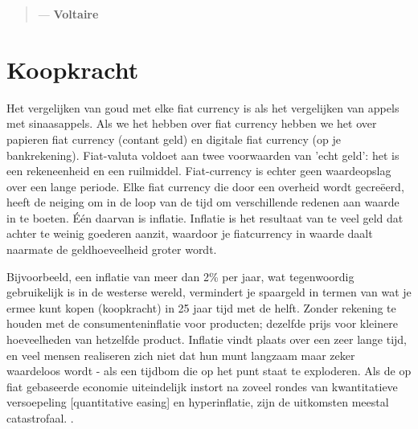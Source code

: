 \begin{quotation}

      \textit{}
      \begin{flushright}
        \small{--- \textbf{Voltaire}}
      \end{flushright}
    
\end{quotation}

\section{Koopkracht}
Het vergelijken van goud met elke fiat currency is als het vergelijken van appels met sinaasappels. Als we het hebben over fiat currency hebben we het over papieren fiat currency (contant geld) en digitale fiat currency (op je bankrekening).  Fiat-valuta voldoet aan twee voorwaarden van 'echt geld': het is een rekeneenheid en een ruilmiddel. Fiat-currency is echter geen waardeopslag over een lange periode.  Elke fiat currency die door een overheid wordt gecre\"eerd, heeft de neiging om in de loop van de tijd om verschillende redenen aan waarde in te boeten. \'E\'en daarvan is inflatie. Inflatie is het resultaat van te veel geld dat achter te weinig goederen aanzit, waardoor je fiatcurrency in waarde daalt naarmate de geldhoeveelheid groter wordt. 

Bijvoorbeeld, een inflatie van meer dan 2\% per jaar, wat tegenwoordig gebruikelijk is in de westerse wereld, vermindert je spaargeld in termen van wat je ermee kunt kopen (koopkracht) in 25 jaar tijd met de helft. Zonder rekening te houden met de consumenteninflatie voor producten; dezelfde prijs voor kleinere hoeveelheden van hetzelfde product. Inflatie vindt plaats over een zeer lange tijd, en veel mensen realiseren zich niet dat hun munt langzaam maar zeker waardeloos wordt - als een tijdbom die op het punt staat te exploderen. Als de op fiat gebaseerde economie uiteindelijk instort na zoveel rondes van kwantitatieve versoepeling [quantitative easing] en hyperinflatie, zijn de uitkomsten meestal catastrofaal. \parencite{weimarhyperinflation}. \medskip

\medskip

